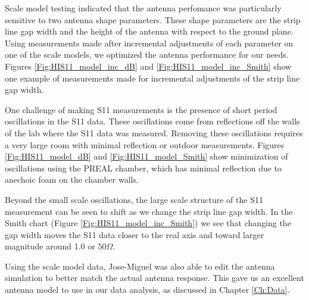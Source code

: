 Scale model testing indicated that the antenna perfomance was particularly sensitive to two antenna shape parameters. These shape parameters are the strip line gap width and the height of the antenna with respect to the ground plane. Using measurements made after incremental adjustments of each parameter on one of the scale models, we optimized the antenna performance for our needs. Figures \ref{Fig:HIS11_model_inc_dB} and \ref{Fig:HIS11_model_inc_Smith} show one example of measurements made for incremental adjustments of the strip line gap width. 

One challenge of making S11 measurements is the presence of short period oscillations in the S11 data. These oscillations come from reflections off the walls of the lab where the S11 data was measured. Removing these oscillations requires a very large room with minimal reflection or outdoor measurements. Figures \ref{Fig:HIS11_model_dB} and \ref{Fig:HIS11_model_Smith} show minimization of oscillations using the PREAL chamber, which has minimal reflection due to anechoic foam on the chamber walls. 

Beyond the small scale oscillations, the large scale structure of the S11 measurement can be seen to shift as we change the strip line gap width. In the Smith chart (Figure \ref{Fig:HIS11_model_inc_Smith}) we see that changing the gap width moves the S11 data closer to the real axis and toward larger magnitude around 1.0 or $50 \Omega$. 

Using the scale model data, Jose-Miguel was also able to edit the antenna simulation to better match the actual antenna response. This gave us an excellent antenna model to use in our data analysis, as discussed in Chapter \ref{Ch:Data}. 

